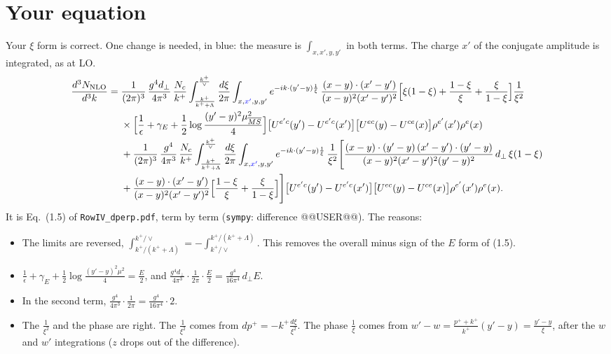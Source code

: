 \documentclass[10pt]{article}
\numberwithin{equation}{section}
\newcommand{\new}[1]{{\color{blue}#1}}
\begin{document}
\section{Your equation}\label{sec:check}
Your $\xi$ form is correct. One change is needed, in blue: the measure is $\int_{x,x',y,y'}$ in both terms. The charge $x'$ of the conjugate amplitude is integrated, as at LO.
\begin{align}
\frac{d^{3}N_{\rm NLO}}{d^{3}k}={}&\frac{1}{(2\pi)^{3}}\,\frac{g^{4}d_{\perp}}{4\pi^{3}}\,\frac{N_{c}}{k^{+}}\int_{\frac{k^{+}}{k^{+}+\Lambda}}^{\frac{k^{+}}{\vee}}\frac{d\xi}{2\pi}\int_{x,\new{x'},y,y'}e^{-ik\cdot(y'-y)\frac{1}{\xi}}\,\frac{(x-y)\cdot(x'-y')}{(x-y)^{2}(x'-y')^{2}}\Big[\xi(1-\xi)+\frac{1-\xi}{\xi}+\frac{\xi}{1-\xi}\Big]\frac{1}{\xi^{2}}\notag\\
&\times\Big[\frac{1}{\epsilon}+\gamma_{E}+\frac{1}{2}\log\frac{(y'-y)^{2}\mu^{2}_{\overline{MS}}}{4}\Big]\big[U^{e'c}(y')-U^{e'c}(x')\big]\big[U^{ec}(y)-U^{ce}(x)\big]\rho^{e'}(x')\rho^{e}(x)\notag\\
&+\frac{1}{(2\pi)^{3}}\,\frac{g^{4}}{4\pi^{3}}\,\frac{N_{c}}{k^{+}}\int_{\frac{k^{+}}{k^{+}+\Lambda}}^{\frac{k^{+}}{\vee}}\frac{d\xi}{2\pi}\int_{x,\new{x'},y,y'}e^{-ik\cdot(y'-y)\frac{1}{\xi}}\,\frac{1}{\xi^{2}}\Bigg[\frac{(x-y)\cdot(y'-y)\,(x'-y')\cdot(y'-y)}{(x-y)^{2}(x'-y')^{2}(y'-y)^{2}}\,d_{\perp}\,\xi(1-\xi)\notag\\
&+\frac{(x-y)\cdot(x'-y')}{(x-y)^{2}(x'-y')^{2}}\Big[\frac{1-\xi}{\xi}+\frac{\xi}{1-\xi}\Big]\Bigg]\big[U^{e'c}(y')-U^{e'c}(x')\big]\big[U^{ec}(y)-U^{ce}(x)\big]\rho^{e'}(x')\rho^{e}(x).
\label{eq:user}
\end{align}
It is Eq.~(1.5) of \texttt{RowIV\_dperp.pdf}, term by term (\texttt{sympy}: difference @@USER@@). The reasons:
\begin{itemize}
\item The limits are reversed, $\int_{k^+/(k^++\Lambda)}^{k^+/\vee}=-\int_{k^+/\vee}^{k^+/(k^++\Lambda)}$. This removes the overall minus sign of the $E$ form of (1.5).
\item $\frac{1}{\epsilon}+\gamma_E+\frac12\log\frac{(y'-y)^2\mu^2}{4}=\frac{E}{2}$, and $\frac{g^4d_\perp}{4\pi^3}\cdot\frac{1}{2\pi}\cdot\frac{E}{2}=\frac{g^4}{16\pi^4}\,d_\perp E$.
\item In the second term, $\frac{g^4}{4\pi^3}\cdot\frac{1}{2\pi}=\frac{g^4}{16\pi^4}\cdot2$.
\item The $\frac{1}{\xi^2}$ and the phase are right. The $\frac{1}{\xi^2}$ comes from $dp^+=-k^+\frac{d\xi}{\xi^2}$. The phase $\frac1\xi$ comes from $w'-w=\frac{p^++k^+}{k^+}(y'-y)=\frac{y'-y}{\xi}$, after the $w$ and $w'$ integrations ($z$ drops out of the difference).
\end{itemize}
\end{document}
